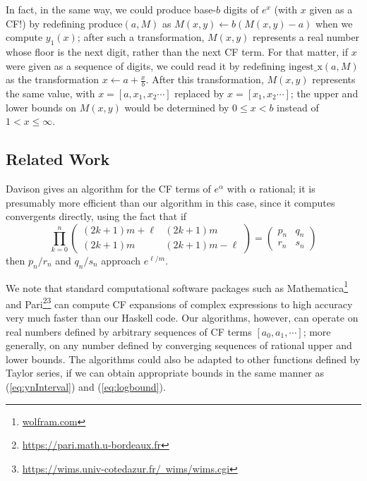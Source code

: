 \documentclass[11pt, oneside]{amsart}   	%
\renewcommand{\:}{\negthickspace:\negthickspace}
\begin{document}
In fact, in the same way, we could produce base-$b$ digits of $e^x$ (with $x$ given as a CF!) by redefining $\mbox{produce}(a, M)$ as $M(x,y) \leftarrow b(M(x,y) - a)$ when we compute $y_1(x)$;
after such a transformation, $M(x,y)$ represents a real number whose floor is the next digit, rather than the next CF term. 
For that matter, if $x$ were given as a sequence of digits, we could read it by redefining $\mbox{ingest\_x}(a,M)$ as the transformation $x \leftarrow a + \frac{x}{b}$. After this transformation, $M(x,y)$ represents the same value, with $x=[a,x_1,x_2\cdots]$ replaced by $x=[x_1,x_2\cdots]$; the upper and lower bounds on $M(x,y)$ would be determined by $0 \leq x < b$ instead of $1 <  x \leq \infty$.


\subsection{Related Work}
Davison \cite{DavisonCFexp} gives an algorithm for the CF terms of $e^{\alpha}$ with $\alpha$ rational;
it is presumably more efficient than our algorithm in this case, since it computes convergents directly, using the fact that if
\[
\prod_{k=0}^n \begin{pmatrix} (2k+1)m+\ell & (2k+1)m \\
                                                       (2k+1)m &  (2k+1)m-\ell \end{pmatrix} = \begin{pmatrix} p_n & q_n \\
                                                                                                                                             r_n & s_n \end{pmatrix}
\]
then $p_n/r_n$ and $q_n/s_n$ approach $e^{\ell/m}$.

We note that standard computational software packages such as Mathematica\footnote{\href{wolfram.com}{wolfram.com}} and Pari\footnote{\href{https://pari.math.u-bordeaux.fr}{https://pari.math.u-bordeaux.fr}}\footnote{\href{https://wims.univ-cotedazur.fr/~wims/wims.cgi}{https://wims.univ-cotedazur.fr/~wims/wims.cgi}} can compute CF expansions of complex expressions to high accuracy very much faster than our Haskell code.
Our algorithms, however, can operate on real numbers defined by arbitrary sequences of CF terms $[a_0,a_1,\cdots]$; more generally, on any number defined by converging sequences of rational upper and lower bounds.
The algorithms could also be adapted to other functions defined by Taylor series, if we can obtain appropriate bounds in the same manner as (\ref{eq:ynInterval}) and (\ref{eq:logbound}).
\end{document}
